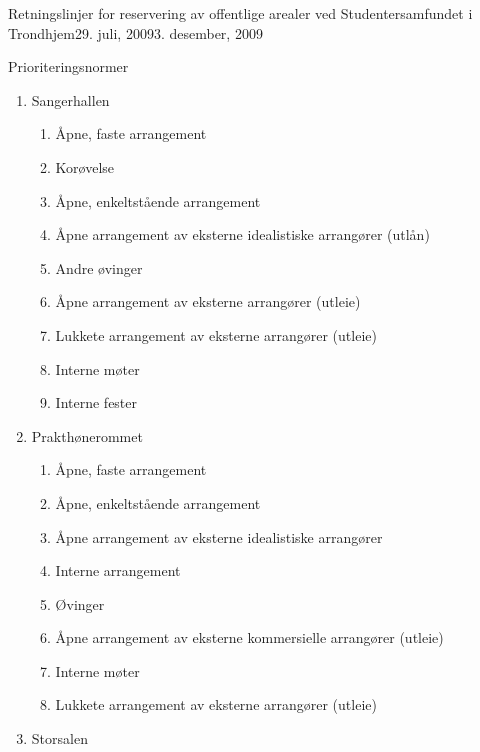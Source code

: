 \begin{instruks}{Retningslinjer for reservering av offentlige arealer
    ved Studentersamfundet i Trondhjem}{29. juli, 2009}{3. desember, 2009}
\begin{instruksledd}{Prioriteringsnormer}
\begin{enumerate}
\begin{enumerate}
\begin{enumerate}
                            \item Lukkete arrangementer av eksterne arrangører (utleie)
                            \item Interne fester
                        \end{enumerate}
                    \item Sangerhallen
                        \begin{enumerate}
                            \item  Åpne, faste arrangement
                            \item Korøvelse
                            \item  Åpne, enkeltstående arrangement
                            \item Åpne arrangement av eksterne idealistiske arrangører (utlån)
                            \item Andre øvinger
                            \item Åpne arrangement av eksterne arrangører (utleie)
                            \item Lukkete arrangement av eksterne arrangører (utleie)
                            \item Interne møter
                            \item Interne fester
                        \end{enumerate}
                    \item Prakthønerommet
                        \begin{enumerate}
                            \item Åpne, faste arrangement
                            \item Åpne, enkeltstående arrangement
                            \item Åpne arrangement av eksterne idealistiske arrangører
                            \item Interne arrangement
                            \item Øvinger
                            \item Åpne arrangement av eksterne kommersielle arrangører (utleie)
                            \item Interne møter
                            \item Lukkete arrangement av eksterne arrangører (utleie)
                        \end{enumerate}
                    \item Storsalen

\end{enumerate}
\end{enumerate}
\end{instruksledd}
\end{instruks}
